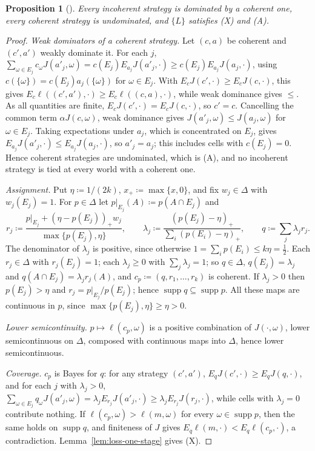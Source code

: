 \documentclass[11pt]{article}
\newcommand{\chg}[1]{{\color{red}#1}}
\newtheorem{proposition}[theorem]{Proposition}
\theoremstyle{definition}
\theoremstyle{remark}
\newcommand{\supp}{\operatorname{supp}}
\begin{document}
\begin{proposition}[{\cite{Briggs2020,Nielsen2021}}]\label{prop:updating}
Every incoherent strategy is dominated by a coherent one, every coherent strategy is undominated, and $\{L\}$ satisfies \chg{(X) and (A)}.
\end{proposition}
\begin{proof}
\emph{Weak dominators of a coherent strategy.} Let $(c,a)$ be coherent and $(c',a')$ weakly dominate it. For each $j$, $\sum_{\omega\in E_j}c_\omega J(a'_j,\omega)=c(E_j)E_{a_j}J(a'_j,\cdot)\ge c(E_j)E_{a_j}J(a_j,\cdot)$, using $c(\{\omega\})=c(E_j)a_j(\{\omega\})$ for $\omega\in E_j$. With $E_cJ(c',\cdot)\ge E_cJ(c,\cdot)$, this gives $E_c\ell((c',a'),\cdot)\ge E_c\ell((c,a),\cdot)$, while weak dominance gives $\le$. As all quantities are finite, $E_cJ(c',\cdot)=E_cJ(c,\cdot)$, so $c'=c$. Cancelling the common term $\alpha J(c,\omega)$, weak dominance gives $J(a'_j,\omega)\le J(a_j,\omega)$ for $\omega\in E_j$. Taking expectations under $a_j$, which is concentrated on $E_j$, gives $E_{a_j}J(a'_j,\cdot)\le E_{a_j}J(a_j,\cdot)$, so $a'_j=a_j$; this includes cells with $c(E_j)=0$. Hence coherent strategies are undominated, which is (A), and no incoherent strategy is tied at every world with a coherent one.

\emph{Assignment.} Put $\eta\coloneqq1/(2k)$, $x_+\coloneqq\max\{x,0\}$, and fix $w_j\in\Delta$ with $w_j(E_j)=1$. For $p\in\Delta$ let $p|_{E_j}(A)\coloneqq p(A\cap E_j)$ and
\[
r_j\coloneqq\frac{p|_{E_j}+(\eta-p(E_j))_+w_j}{\max\{p(E_j),\eta\}},\qquad \lambda_j\coloneqq\frac{(p(E_j)-\eta)_+}{\sum_i(p(E_i)-\eta)_+},\qquad q\coloneqq\sum_j\lambda_jr_j .
\]
The denominator of $\lambda_j$ is positive, since otherwise $1=\sum_ip(E_i)\le k\eta=\tfrac12$. Each $r_j\in\Delta$ with $r_j(E_j)=1$; each $\lambda_j\ge0$ with $\sum_j\lambda_j=1$; so $q\in\Delta$, $q(E_j)=\lambda_j$ and $q(A\cap E_j)=\lambda_jr_j(A)$, and $c_p\coloneqq(q,r_1,\dots,r_k)$ is coherent. If $\lambda_j>0$ then $p(E_j)>\eta$ and $r_j=p|_{E_j}/p(E_j)$; hence $\supp q\subseteq\supp p$. All these maps are continuous in $p$, since $\max\{p(E_j),\eta\}\ge\eta>0$.

\emph{Lower semicontinuity.} $p\mapsto\ell(c_p,\omega)$ is a positive combination of $J(\cdot,\omega)$, lower semicontinuous on $\Delta$, composed with continuous maps into $\Delta$, hence lower semicontinuous.

\emph{Coverage.} $c_p$ is Bayes for $q$: for any strategy $(c',a')$, $E_qJ(c',\cdot)\ge E_qJ(q,\cdot)$, and for each $j$ with $\lambda_j>0$, $\sum_{\omega\in E_j}q_\omega J(a'_j,\omega)=\lambda_jE_{r_j}J(a'_j,\cdot)\ge\lambda_jE_{r_j}J(r_j,\cdot)$, while cells with $\lambda_j=0$ contribute nothing. If $\ell(c_p,\omega)>\ell(m,\omega)$ for every $\omega\in\supp p$, then the same holds on $\supp q$, and finiteness of $J$ gives $E_q\ell(m,\cdot)<E_q\ell(c_p,\cdot)$, a contradiction. Lemma~\ref{lem:loss-one-stage} gives (X).
\end{proof}
\end{document}
